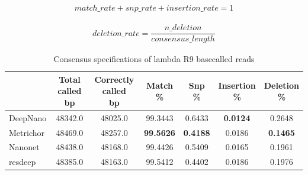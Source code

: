 \documentclass[runningheads,a4paper]{llncs}
\begin{document}
\begin{equation}
\begin{gathered}
match\_rate  + snp\_rate + insertion\_rate = 1
\end{gathered}
\end{equation}


\begin{equation}
\begin{gathered}
deletion\_rate = \dfrac{n\_deletion}{consensus\_length}
\end{gathered}
\end{equation}

\begin{table}[]
	\caption{Consensus specifications of lambda R9 basecalled reads}
	\label{tbl:spec_lambda}
	\centering
	\begin{tabular}{lcccccc}
		\toprule
		{} &  \thead{Total called\\\lbrack bp\rbrack} &  \thead{Correctly called\\\lbrack bp\rbrack} &  \thead{Match\\\%} &  \thead{Snp\\\%} &  \thead{Insertion\\\%} &  \thead{Deletion\\\%} \\
		\midrule
		DeepNano  &                    48342.0 &                        48025.0 &          99.3443 &         0.6433 &               \textbf{0.0124} &              0.2648 \\
		Metrichor &                    48469.0 &                        48257.0 &          \textbf{99.5626} &         \textbf{0.4188} &               0.0186 &              \textbf{0.1465} \\
		Nanonet   &                    48438.0 &                        48168.0 &          99.4426 &         0.5409 &               0.0165 &              0.1961 \\
		resdeep   &                    48385.0 &                        48163.0 &          99.5412 &         0.4402 &               0.0186 &              0.1976 \\
		\bottomrule
	\end{tabular}
\end{table}
\end{document}
